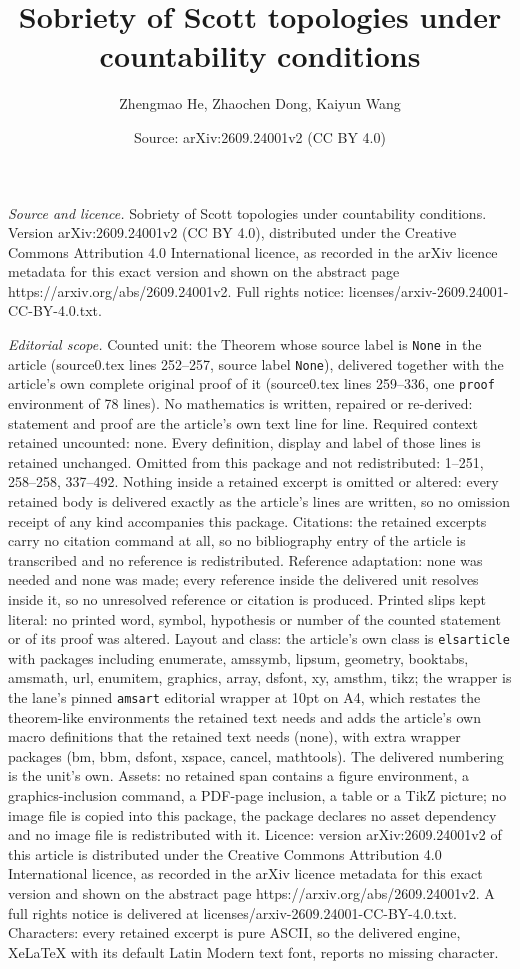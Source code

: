 \documentclass[10pt,a4paper]{amsart}
\title[Sobriety of Scott topologies under countability conditions]{Sobriety of Scott topologies under countability conditions}
\author{Zhengmao He, Zhaochen Dong, Kaiyun Wang}
\date{Source: arXiv:2609.24001v2 (CC BY 4.0)}
\begin{document}
\maketitle

\noindent\emph{Source and licence.} Sobriety of Scott topologies under countability conditions. Version arXiv:2609.24001v2 (CC BY 4.0), distributed under the Creative Commons Attribution 4.0 International licence, as recorded in the arXiv licence metadata for this exact version and shown on the abstract page https://arxiv.org/abs/2609.24001v2. Full rights notice: licenses/arxiv-2609.24001-CC-BY-4.0.txt.\par\smallskip

\noindent\textit{Editorial scope.} Counted unit: the Theorem whose source label is \texttt{None} in the article (source0.tex lines 252--257, source label \texttt{None}), delivered together with the article's own complete original proof of it (source0.tex lines 259--336, one \texttt{proof} environment of 78 lines). No mathematics is written, repaired or re-derived: statement and proof are the article's own text line for line. Required context retained uncounted: none. Every definition, display and label of those lines is retained unchanged. Omitted from this package and not redistributed: 1--251, 258--258, 337--492. Nothing inside a retained excerpt is omitted or altered: every retained body is delivered exactly as the article's lines are written, so no omission receipt of any kind accompanies this package. Citations: the retained excerpts carry no citation command at all, so no bibliography entry of the article is transcribed and no reference is redistributed. Reference adaptation: none was needed and none was made; every reference inside the delivered unit resolves inside it, so no unresolved reference or citation is produced. Printed slips kept literal: no printed word, symbol, hypothesis or number of the counted statement or of its proof was altered. Layout and class: the article's own class is \texttt{elsarticle} with packages including enumerate, amssymb, lipsum, geometry, booktabs, amsmath, url, enumitem, graphics, array, dsfont, xy, amsthm, tikz; the wrapper is the lane's pinned \texttt{amsart} editorial wrapper at 10pt on A4, which restates the theorem-like environments the retained text needs and adds the article's own macro definitions that the retained text needs (none), with extra wrapper packages (bm, bbm, dsfont, xspace, cancel, mathtools). The delivered numbering is the unit's own. Assets: no retained span contains a figure environment, a graphics-inclusion command, a PDF-page inclusion, a table or a TikZ picture; no image file is copied into this package, the package declares no asset dependency and no image file is redistributed with it. Licence: version arXiv:2609.24001v2 of this article is distributed under the Creative Commons Attribution 4.0 International licence, as recorded in the arXiv licence metadata for this exact version and shown on the abstract page https://arxiv.org/abs/2609.24001v2. A full rights notice is delivered at licenses/arxiv-2609.24001-CC-BY-4.0.txt. Characters: every retained excerpt is pure ASCII, so the delivered engine, XeLaTeX with its default Latin Modern text font, reports no missing character.
\end{document}
